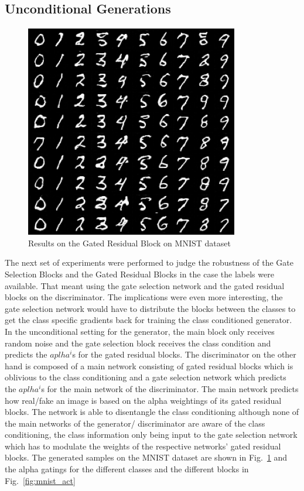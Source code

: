 \documentclass[10pt,twocolumn,letterpaper]{article}
\def\figref#1{Fig.~\ref{#1}}
\begin{document}
\subsection{Unconditional Generations}
\begin{figure}
    \centering
    \includegraphics[width=0.5\linewidth]{Picture5}
    \caption{Results on the Gated Residual Block on MNIST dataset}\label{fig:grb_mnist}
    \vspace{-4mm}
\end{figure}

The next set of experiments were performed to judge the robustness of the Gate Selection Blocks and the Gated Residual Blocks in the case the labels were available. That meant using the gate selection network and the gated residual blocks on the discriminator. The implications were even more interesting, the gate selection network would have to distribute the blocks between the classes to get the class specific gradients back for training the class conditioned generator. In the unconditional setting for the generator, the main block only receives random noise and the gate selection block receives the class condition and predicts the $aplha^i$s for the gated residual blocks. The discriminator on the other hand is composed of a main network consisting of gated residual blocks which is oblivious to the class conditioning and a gate selection network which predicts the $aplha^i$s for the main network of the discriminator. The main network predicts how real/fake an image is based on the alpha weightings of its gated residual blocks. The network is able to disentangle the class conditioning although none of the main networks of the generator/ discriminator are aware of the class conditioning, the class information only being input to the gate selection network which has to modulate the weights of the respective networks' gated residual blocks. The generated samples on the MNIST dataset are shown in \figref{fig:grb_mnist} and the alpha gatings for the different classes and the different blocks in \figref{fig:mnist_act}
\end{document}
